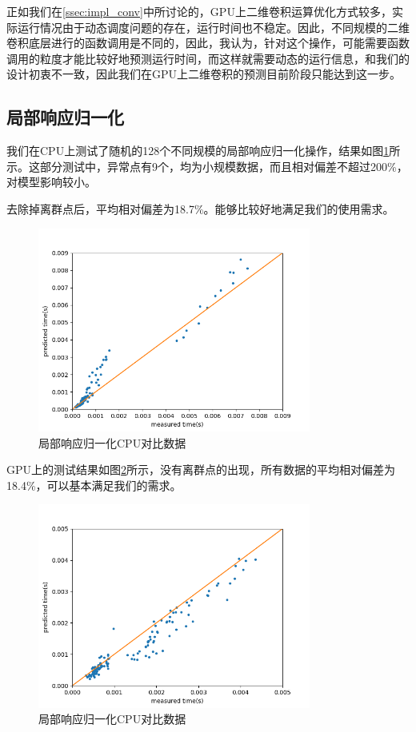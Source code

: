     正如我们在\ref{ssec:impl_conv}中所讨论的，GPU上二维卷积运算优化方式较多，实际运行情况由于动态调度问题的存在，运行时间也不稳定。因此，不同规模的二维卷积底层进行的函数调用是不同的，因此，我认为，针对这个操作，可能需要函数调用的粒度才能比较好地预测运行时间，而这样就需要动态的运行信息，和我们的设计初衷不一致，因此我们在GPU上二维卷积的预测目前阶段只能达到这一步。

\subsection{局部响应归一化}
    我们在CPU上测试了随机的128个不同规模的局部响应归一化操作，结果如图\ref{fig:lrn_cpu_cmp}所示。这部分测试中，异常点有9个，均为小规模数据，而且相对偏差不超过200\%，对模型影响较小。
    
    去除掉离群点后，平均相对偏差为18.7\%。能够比较好地满足我们的使用需求。

    \begin{figure}[!htbp]
        \centering
        \includegraphics[width=0.8\textwidth]{figures/lrn_cpu_cmp.png}
        \caption{局部响应归一化CPU对比数据}
        \label{fig:lrn_cpu_cmp}
    \end{figure}
    
    GPU上的测试结果如图\ref{fig:lrn_gpu_cmp}所示，没有离群点的出现，所有数据的平均相对偏差为18.4\%，可以基本满足我们的需求。

    \begin{figure}[!htbp]
        \centering
        \includegraphics[width=0.8\textwidth]{figures/lrn_gpu_cmp.png}
        \caption{局部响应归一化CPU对比数据}
        \label{fig:lrn_gpu_cmp}
    \end{figure}

